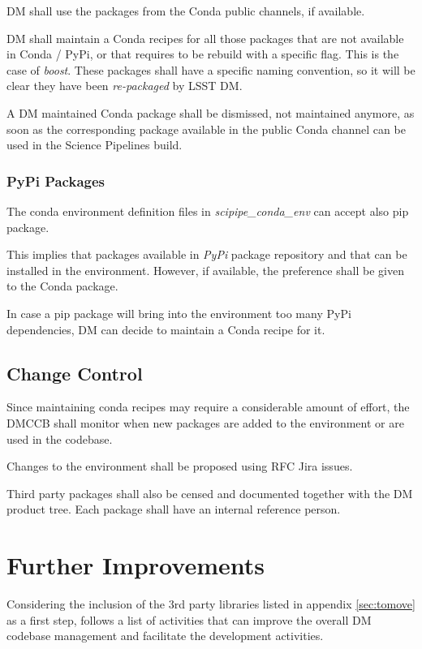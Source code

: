 DM shall use the packages from the Conda public channels, if available.

DM shall maintain a Conda recipes for all those packages that are not available in Conda / PyPi, or that requires to be rebuild with a specific flag. This is the case of \textit{boost}.
These packages shall have a specific naming convention, so it will be clear they have been \textit{re-packaged} by LSST DM.

A DM maintained Conda package shall be dismissed, not maintained anymore, as soon as the corresponding package available in the public Conda channel can be used in the Science Pipelines build.


\subsubsection{PyPi Packages} \label{sec:pypi}

The conda environment definition files in \textit{scipipe\_conda\_env} can accept also pip package. 

This implies that packages available in \textit{PyPi} package repository and that can be installed in the environment. 
However, if available, the preference shall be given to the Conda package.

In case a pip package will bring into the environment too many PyPi dependencies, DM can decide to maintain a Conda recipe for it.


\subsection{Change Control}

Since maintaining conda recipes may require a considerable amount of effort, the DMCCB shall monitor when new packages are added to the environment or are used in the codebase.

Changes to the environment shall be proposed using RFC Jira issues.

Third party packages shall also be censed and documented together with the DM product tree. 
Each package shall have an internal reference person.


\newpage
\section{Further Improvements}

Considering the inclusion of the 3rd party libraries listed in appendix \ref{sec:tomove} as a first step, follows a list of activities that can improve the overall DM codebase management and facilitate the development activities.

